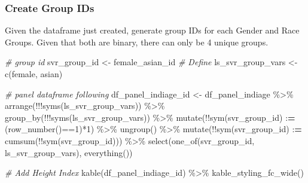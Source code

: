 \documentclass[
]{book}
\newenvironment{Shaded}{\begin{snugshade}}{\end{snugshade}}
\newcommand{\CommentTok}[1]{\textcolor[rgb]{0.56,0.35,0.01}{\textit{#1}}}
\newcommand{\DecValTok}[1]{\textcolor[rgb]{0.00,0.00,0.81}{#1}}
\newcommand{\ErrorTok}[1]{\textcolor[rgb]{0.64,0.00,0.00}{\textbf{#1}}}
\newcommand{\FunctionTok}[1]{\textcolor[rgb]{0.00,0.00,0.00}{#1}}
\newcommand{\NormalTok}[1]{#1}
\newcommand{\OtherTok}[1]{\textcolor[rgb]{0.56,0.35,0.01}{#1}}
\newcommand{\SpecialCharTok}[1]{\textcolor[rgb]{0.00,0.00,0.00}{#1}}
\newcommand{\StringTok}[1]{\textcolor[rgb]{0.31,0.60,0.02}{#1}}
\begin{document}
\hypertarget{create-group-ids}{%
\subsubsection{Create Group IDs}\label{create-group-ids}}

Given the dataframe just created, generate group IDs for each Gender and Race Groups. Given that both are binary, there can only be 4 unique groups.

\begin{Shaded}
\begin{Highlighting}[]
\CommentTok{\# group id}
\NormalTok{svr\_group\_id }\OtherTok{\textless{}{-}} \StringTok{\textquotesingle{}female\_asian\_id\textquotesingle{}}
\CommentTok{\# Define}
\NormalTok{ls\_svr\_group\_vars }\OtherTok{\textless{}{-}} \FunctionTok{c}\NormalTok{(}\StringTok{\textquotesingle{}female\textquotesingle{}}\NormalTok{, }\StringTok{\textquotesingle{}asian\textquotesingle{}}\NormalTok{)}

\CommentTok{\# panel dataframe following}
\NormalTok{df\_panel\_indiage\_id }\OtherTok{\textless{}{-}}\NormalTok{ df\_panel\_indiage }\SpecialCharTok{\%\textgreater{}\%}
  \FunctionTok{arrange}\NormalTok{(}\SpecialCharTok{!!!}\FunctionTok{syms}\NormalTok{(ls\_svr\_group\_vars)) }\SpecialCharTok{\%\textgreater{}\%}
  \FunctionTok{group\_by}\NormalTok{(}\SpecialCharTok{!!!}\FunctionTok{syms}\NormalTok{(ls\_svr\_group\_vars)) }\SpecialCharTok{\%\textgreater{}\%}
  \FunctionTok{mutate}\NormalTok{(}\SpecialCharTok{!!}\FunctionTok{sym}\NormalTok{(svr\_group\_id) }\SpecialCharTok{:}\ErrorTok{=}\NormalTok{ (}\FunctionTok{row\_number}\NormalTok{()}\SpecialCharTok{==}\DecValTok{1}\NormalTok{)}\SpecialCharTok{*}\DecValTok{1}\NormalTok{) }\SpecialCharTok{\%\textgreater{}\%}
  \FunctionTok{ungroup}\NormalTok{() }\SpecialCharTok{\%\textgreater{}\%}
  \FunctionTok{mutate}\NormalTok{(}\SpecialCharTok{!!}\FunctionTok{sym}\NormalTok{(svr\_group\_id) }\SpecialCharTok{:}\ErrorTok{=} \FunctionTok{cumsum}\NormalTok{(}\SpecialCharTok{!!}\FunctionTok{sym}\NormalTok{(svr\_group\_id))) }\SpecialCharTok{\%\textgreater{}\%}
  \FunctionTok{select}\NormalTok{(}\FunctionTok{one\_of}\NormalTok{(svr\_group\_id, ls\_svr\_group\_vars), }\FunctionTok{everything}\NormalTok{())}

\CommentTok{\# Add Height Index}
\FunctionTok{kable}\NormalTok{(df\_panel\_indiage\_id) }\SpecialCharTok{\%\textgreater{}\%}
  \FunctionTok{kable\_styling\_fc\_wide}\NormalTok{()}
\end{Highlighting}
\end{Shaded}
\end{document}
